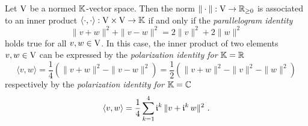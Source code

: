 \begin{theorem} 
\label{thm:parallegram-identity-guarantees-that-norm-comes-from-some-inner-product}
Let $\mathrm{V}$ be a normed $\mathbb{K}$-vector space. Then the norm $\|\cdot\| : \mathrm{V} \to \mathbb{R}_{\geq 0}$
is associated to an inner product $\langle \cdot , \cdot \rangle :  \mathrm{V} \times \mathrm{V} \to \mathbb{K}$ 
if and only if the \emph{parallelogram identity} 
\[
  \| v + w \|^2 + \| v -  w\|^2 = 2\|v\|^2 + 2\|w\|^2 
\]
holds true for all $v,w \in \mathrm{V}$. In this case, the inner product of two elements $v,w\in \mathrm{V}$
can be expressed by the \emph{polarization identity for} $\mathbb{K} = \mathbb{R}$
\begin{equation}
  \label{eq:real-polarization-identity}
  \langle v , w \rangle = \frac 14 \left( \| v + w \|^2  - \| v - w \|^2 \right)
  = \frac 12 \left( \| v + w \|^2  - \| v \|^2 - \| w \|^2 \right)
\end{equation}
respectively by the  \emph{polarization identity for} $\mathbb{K} = \mathbb{C}$
\begin{equation}
  \label{eq:complex-polarization-identity}
  \langle v , w \rangle = \frac 14 \sum_{k=1}^4 \mathfrak{i}^k \, \| v + \mathfrak{i}^k \, w \|^2  \ .
\end{equation}
\end{theorem}
